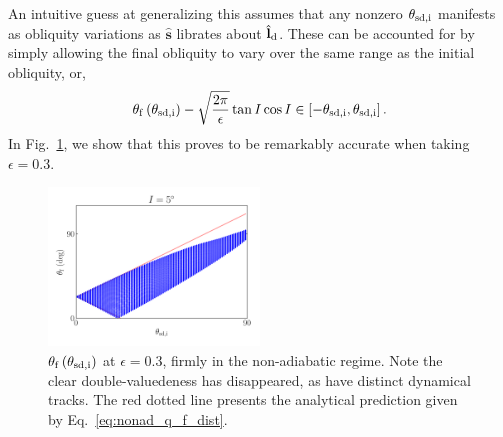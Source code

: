 \documentclass[
        fleqn,
        usenatbib,
    ]{mnras}
\newcommand*{\bm}[1]{\boldsymbol{\mathbf{#1}}}
\newcommand*{\uv}[1]{\hat{\bm{#1}}}
\newcommand*{\p}[1]{\left(#1\right)}
\newcommand*{\s}[1]{\left[#1\right]}
\begin{document}
An intuitive guess at generalizing this assumes that any nonzero $\theta_{\rm
sd, i}$ manifests as obliquity variations as $\uv{s}$ librates about
$\uv{l}_{\rm d}$. These can be accounted for by simply allowing the final
obliquity to vary over the same range as the initial obliquity, or,
\begin{equation}
    \theta_{\rm f}\p{\theta_{\rm sd, i}} - \sqrt{\frac{2\pi}{\epsilon}} \tan
        I\cos I\in \s{-\theta_{\rm sd, i}, \theta_{\rm sd,i}}
        .\label{eq:nonad_q_f_dist}
\end{equation}
In Fig.~\ref{fig:nonad_3_ensemeble}, we show that this proves to be remarkably
accurate when taking $\epsilon = 0.3$.
\begin{figure}
    \centering
    \includegraphics[width=0.5\textwidth]{plots_diskdisp/3_ensemble_05_05.png}
    \caption{$\theta_{\rm  f}\p{\theta_{\rm sd, i}}$ at $\epsilon = 0.3$, firmly
    in the non-adiabatic regime. Note the clear double-valuedeness has
    disappeared, as have distinct dynamical tracks. The red dotted line presents
    the analytical prediction given by
    Eq.~\eqref{eq:nonad_q_f_dist}.}\label{fig:nonad_3_ensemeble}
\end{figure}
\end{document}
